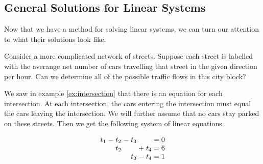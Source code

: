 \subsection*{General Solutions for Linear Systems}

Now that we have a method for solving linear systems, we can turn our attention to what their solutions look like.

\begin{example}\label{ex:traffic2}
	Consider a more complicated network of streets. Suppose each street is labelled with the averange net number of cars travelling that street in the given direction per hour. Can we determine all of the possible traffic flows in this city block?
	\begin{center}
		\end{center}
		
		We saw in example \ref{ex:intersection} that there is an equation for each intersection. At each intersection, the cars entering the intersection must equal the cars leaving the intersection. We will further assume that no cars stay parked on these streets. Then we get the following system of linear equations.
		
		\[
			\arraycolsep=1.4pt
			\begin{array}{rcrcrcrl}
				t_1 & - & t_2 & - & t_3 & & & = 0\\
				& & t_2 & & & + & t_4 & = 6\\
				& & & & t_3 & - & t_4 & =  1
			\end{array}
		\]
		

\end{example}
